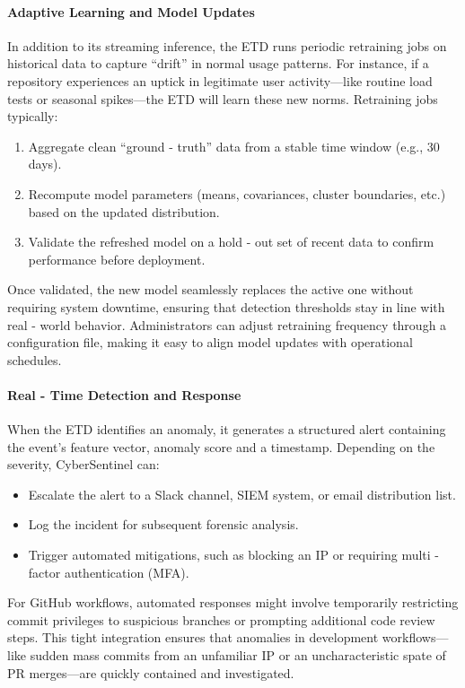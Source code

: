 \documentclass{article}
\begin{document}
\paragraph{Adaptive Learning and Model Updates}
In addition to its streaming inference, the ETD runs periodic retraining jobs on historical data to capture “drift” in normal usage patterns. For instance, if a repository experiences an uptick in legitimate user activity—like routine load tests or seasonal spikes—the ETD will learn these new norms. Retraining jobs typically:
\begin{enumerate}
    \item Aggregate clean “ground - truth” data from a stable time window (e.g., 30 days).
    \item Recompute model parameters (means, covariances, cluster boundaries, etc.) based on the updated distribution.
    \item Validate the refreshed model on a hold - out set of recent data to confirm performance before deployment.
\end{enumerate}
Once validated, the new model seamlessly replaces the active one without requiring system downtime, ensuring that detection thresholds stay in line with real - world behavior. Administrators can adjust retraining frequency through a configuration file, making it easy to align model updates with operational schedules.

\paragraph{Real - Time Detection and Response}
When the ETD identifies an anomaly, it generates a structured alert containing the event’s feature vector, anomaly score and a timestamp. Depending on the severity, CyberSentinel can:
\begin{itemize}
    \item Escalate the alert to a Slack channel, SIEM system, or email distribution list.
    \item Log the incident for subsequent forensic analysis.
    \item Trigger automated mitigations, such as blocking an IP or requiring multi - factor authentication (MFA).
\end{itemize}
For GitHub workflows, automated responses might involve temporarily restricting commit privileges to suspicious branches or prompting additional code review steps. This tight integration ensures that anomalies in development workflows—like sudden mass commits from an unfamiliar IP or an uncharacteristic spate of PR merges—are quickly contained and investigated.
\end{document}
